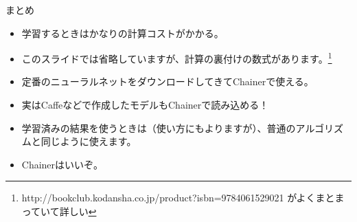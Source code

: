 \documentclass[12pt, unicode]{beamer}
\begin{document}
\begin{frame}{まとめ}
\begin{block}{}
\begin{itemize}
\item 学習するときはかなりの計算コストがかかる。
\item このスライドでは省略していますが、計算の裏付けの数式があります。\footnote[frame]{http://bookclub.kodansha.co.jp/product?isbn=9784061529021 がよくまとまっていて詳しい}
\item 定番のニューラルネットをダウンロードしてきてChainerで使える。
\item 実はCaffeなどで作成したモデルもChainerで読み込める！
\item 学習済みの結果を使うときは（使い方にもよりますが）、普通のアルゴリズムと同じように使えます。
\item Chainerはいいぞ。
\end{itemize}
\end{block}
\end{frame}
\end{document}
